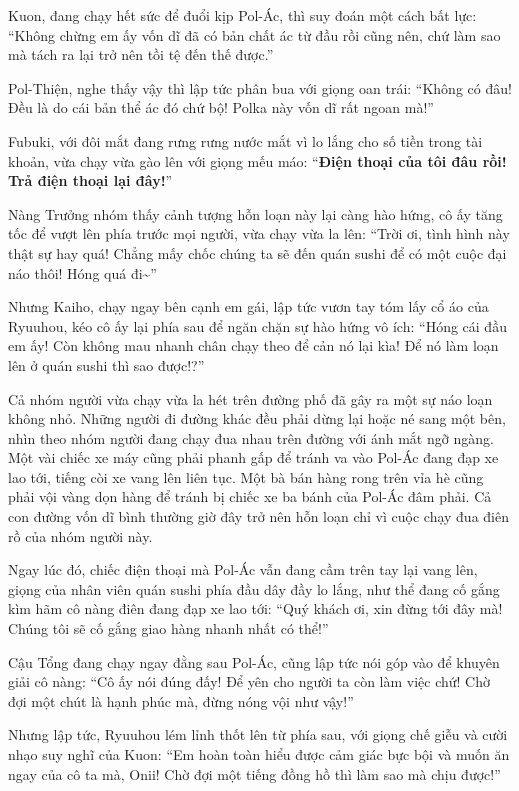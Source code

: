 \documentclass[../main.tex]{subfiles}
\begin{document}
Kuon, đang chạy hết sức để đuổi kịp Pol-Ác, thì suy đoán một cách bất lực: ``Không chừng em ấy vốn dĩ đã có bản chất ác từ đầu rồi cũng nên, chứ làm sao mà tách ra lại trở nên tồi tệ đến thế được.''

Pol-Thiện, nghe thấy vậy thì lập tức phân bua với giọng oan trái: ``Không có đâu! Đều là do cái bản thể ác đó chứ bộ! Polka này vốn dĩ rất ngoan mà!''

Fubuki, với đôi mắt đang rưng rưng nước mắt vì lo lắng cho số tiền trong tài khoản, vừa chạy vừa gào lên với giọng mếu máo: ``\textbf{Điện thoại của tôi đâu rồi! Trả điện thoại lại đây!}''

Nàng Trưởng nhóm thấy cảnh tượng hỗn loạn này lại càng hào hứng, cô ấy tăng tốc để vượt lên phía trước mọi người, vừa chạy vừa la lên: ``Trời ơi, tình hình này thật sự hay quá! Chẳng mấy chốc chúng ta sẽ đến quán sushi để có một cuộc đại náo thôi! Hóng quá đi\~{}''

Nhưng Kaiho, chạy ngay bên cạnh em gái, lập tức vươn tay tóm lấy cổ áo của Ryuuhou, kéo cô ấy lại phía sau để ngăn chặn sự hào hứng vô ích: ``Hóng cái đầu em ấy! Còn không mau nhanh chân chạy theo để cản nó lại kìa! Để nó làm loạn lên ở quán sushi thì sao được!?''

Cả nhóm người vừa chạy vừa la hét trên đường phố đã gây ra một sự náo loạn không nhỏ. Những người đi đường khác đều phải dừng lại hoặc né sang một bên, nhìn theo nhóm người đang chạy đua nhau trên đường với ánh mắt ngỡ ngàng. Một vài chiếc xe máy cũng phải phanh gấp để tránh va vào Pol-Ác đang đạp xe lao tới, tiếng còi xe vang lên liên tục. Một bà bán hàng rong trên vỉa hè cũng phải vội vàng dọn hàng để tránh bị chiếc xe ba bánh của Pol-Ác đâm phải. Cả con đường vốn dĩ bình thường giờ đây trở nên hỗn loạn chỉ vì cuộc chạy đua điên rồ của nhóm người này.

Ngay lúc đó, chiếc điện thoại mà Pol-Ác vẫn đang cầm trên tay lại vang lên, giọng của nhân viên quán sushi phía đầu dây đầy lo lắng, như thể đang cố gắng kìm hãm cô nàng điên đang đạp xe lao tới: ``Quý khách ơi, xin đừng tới đây mà! Chúng tôi sẽ cố gắng giao hàng nhanh nhất có thể!''

Cậu Tổng đang chạy ngay đằng sau Pol-Ác, cũng lập tức nói góp vào để khuyên giải cô nàng: ``Cô ấy nói đúng đấy! Để yên cho người ta còn làm việc chứ! Chờ đợi một chút là hạnh phúc mà, đừng nóng vội như vậy!''

Nhưng lập tức, Ryuuhou lém lỉnh thốt lên từ phía sau, với giọng chế giễu và cười nhạo suy nghĩ của Kuon: ``Em hoàn toàn hiểu được cảm giác bực bội và muốn ăn ngay của cô ta mà, Onii! Chờ đợi một tiếng đồng hồ thì làm sao mà chịu được!''
\end{document}
